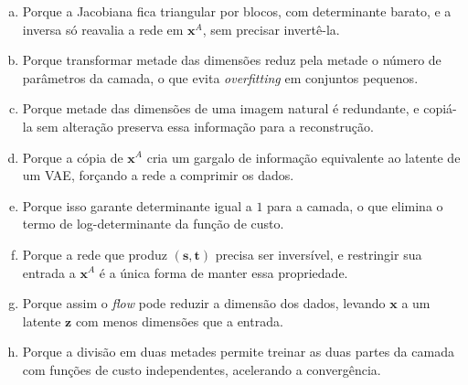 \documentclass[11pt,a4paper]{article}
\begin{document}
\begin{enumerate}[1)]
\begin{center}
\end{center}

\begin{enumerate}[a)]
    \item Porque a Jacobiana fica triangular por blocos, com determinante barato, e a inversa só reavalia a rede em $\mathbf{x}^{A}$, sem precisar invertê-la.
    \item Porque transformar metade das dimensões reduz pela metade o número de parâmetros da camada, o que evita \textit{overfitting} em conjuntos pequenos.
    \item Porque metade das dimensões de uma imagem natural é redundante, e copiá-la sem alteração preserva essa informação para a reconstrução.
    \item Porque a cópia de $\mathbf{x}^{A}$ cria um gargalo de informação equivalente ao latente de um VAE, forçando a rede a comprimir os dados.
    \item Porque isso garante determinante igual a $1$ para a camada, o que elimina o termo de log-determinante da função de custo.
    \item Porque a rede que produz $(\mathbf{s}, \mathbf{t})$ precisa ser inversível, e restringir sua entrada a $\mathbf{x}^{A}$ é a única forma de manter essa propriedade.
    \item Porque assim o \textit{flow} pode reduzir a dimensão dos dados, levando $\mathbf{x}$ a um latente $\mathbf{z}$ com menos dimensões que a entrada.
    \item Porque a divisão em duas metades permite treinar as duas partes da camada com funções de custo independentes, acelerando a convergência.
\end{enumerate}


\end{enumerate}
\end{document}
